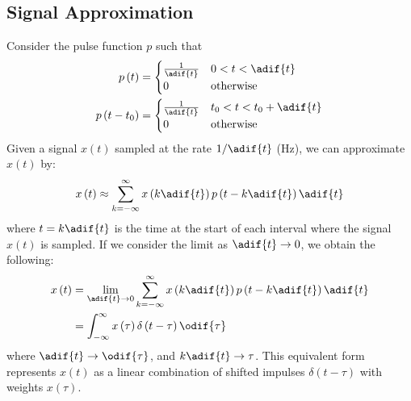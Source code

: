 \documentclass{article}
\begin{document}
\subsection{Signal Approximation}
Consider the pulse function \(p\) such that
\begin{align*}
    p\left( t \right)       & = \begin{cases}
                                    \frac{1}{\adif{t}} & 0 < t < \adif{t} \\
                                    0                  & \text{otherwise}
                                \end{cases}         \\
    p\left( t - t_0 \right) & = \begin{cases}
                                    \frac{1}{\adif{t}} & t_0 < t < t_0 + \adif{t} \\
                                    0                  & \text{otherwise}
                                \end{cases}
\end{align*}
Given a signal \(x\left( t \right)\) sampled at the rate \(1/\adif{t}\) (\unit{Hz}),
we can approximate \(x\left( t \right)\) by:
\begin{equation*}
    x\left( t \right) \approx \sum_{k = -\infty}^\infty x\left( k \adif{t} \right) p\left( t - k \adif{t} \right) \adif{t}
\end{equation*}
where \(t = k \adif{t}\) is the time at the start of each interval where the signal \(x\left( t \right)\) is sampled.
If we consider the limit as \(\adif{t} \to 0\), we obtain the following:
\begin{align*}
    x\left( t \right) & = \lim_{\adif{t} \to 0} \sum_{k = -\infty}^\infty x\left( k \adif{t} \right) p\left( t - k \adif{t} \right) \adif{t} \\
                      & = \int_{-\infty}^\infty x\left( \tau \right) \delta\left( t - \tau \right) \odif{\tau}
\end{align*}
where \(\adif{t} \to \odif{\tau}\), and \(k \adif{t} \to \tau\).
This equivalent form represents \(x\left( t \right)\) as a linear combination of shifted impulses \(\delta\left( t - \tau \right)\)
with weights \(x\left( \tau \right)\).
\end{document}
